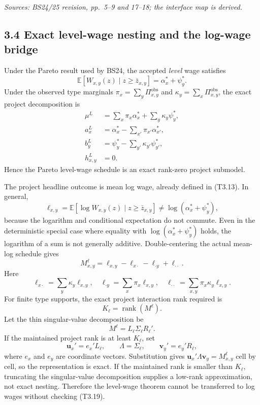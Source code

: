 \documentclass[11pt]{article}
\begin{document}
\textit{Sources: BS24/25 revision, pp.\ 5--9 and 17--18; the interface map is
derived.}

\subsection{3.4 Exact level-wage nesting and the log-wage bridge}

Under the Pareto result used by BS24, the accepted \emph{level} wage satisfies
\[
\mathbb E[W_{x,y}(z)\mid z\geq\bar z_{x,y}]
=
\alpha_x^*+\psi_y^*.
\tag{T3.15}
\]
Under the observed type marginals
\(\pi_x=\sum_y\Pi^{\mathrm{obs}}_{x,y}\) and
\(\kappa_y=\sum_x\Pi^{\mathrm{obs}}_{x,y}\), the exact project decomposition is
\[
\begin{aligned}
\mu^L
&=
\sum_x\pi_x\alpha_x^*
+\sum_y\kappa_y\psi_y^*,\\
a_x^L
&=
\alpha_x^*-\sum_{x'}\pi_{x'}\alpha_{x'}^*,\\
b_y^L
&=
\psi_y^*-\sum_{y'}\kappa_{y'}\psi_{y'}^*,\\
h_{x,y}^L&=0.
\end{aligned}
\tag{T3.16}
\]
Hence the Pareto level-wage schedule is an exact rank-zero project submodel.

The project headline outcome is mean log wage, already defined in (T3.13).
In general,
\[
\ell_{x,y}
=
\mathbb E[\log W_{x,y}(z)\mid z\geq\bar z_{x,y}]
\neq
\log(\alpha_x^*+\psi_y^*),
\tag{T3.17}
\]
because the logarithm and conditional expectation do not commute.  Even in
the deterministic special case where equality with
\(\log(\alpha_x^*+\psi_y^*)\) holds, the logarithm of a sum is not generally
additive.  Double-centering the actual mean-log schedule gives
\[
M^\ell_{x,y}
=
\ell_{x,y}-\ell_{x\cdot}-\ell_{\cdot y}+\ell_{\cdot\cdot}.
\tag{T3.18}
\]
Here
\[
\ell_{x\cdot}=\sum_y\kappa_y\ell_{x,y},
\quad
\ell_{\cdot y}=\sum_x\pi_x\ell_{x,y},
\quad
\ell_{\cdot\cdot}=\sum_{x,y}\pi_x\kappa_y\ell_{x,y}.
\tag{T3.18a}
\]
For finite type supports, the exact project interaction rank required is
\[
K_\ell=\operatorname{rank}(M^\ell).
\tag{T3.19}
\]
Let the thin singular-value decomposition be
\[
M^\ell=L_\ell\Sigma_\ell R_\ell'.
\tag{T3.20}
\]
If the maintained project rank is at least \(K_\ell\), set
\[
\mathbf u_x'=e_x'L_\ell,\qquad
\Lambda=\Sigma_\ell,\qquad
\mathbf v_y'=e_y'R_\ell,
\tag{T3.21}
\]
where \(e_x\) and \(e_y\) are coordinate vectors.  Substitution gives
\(\mathbf u_x'\Lambda\mathbf v_y=M^\ell_{x,y}\) cell by cell, so the
representation is exact.  If the maintained rank is smaller than
\(K_\ell\), truncating the singular-value decomposition supplies a low-rank
approximation, not exact nesting.  Therefore the level-wage theorem cannot be
transferred to log wages without checking (T3.19).
\end{document}
